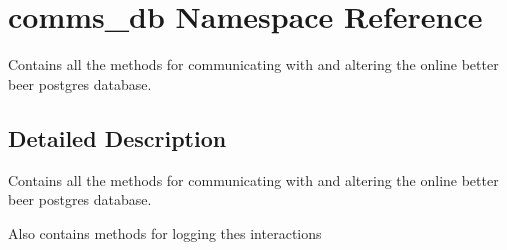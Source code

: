 \hypertarget{namespacecomms__db}{}\section{comms\+\_\+db Namespace Reference}
\label{namespacecomms__db}


Contains all the methods for communicating with and altering the online better beer postgres database.  




\subsection{Detailed Description}
Contains all the methods for communicating with and altering the online better beer postgres database. 

Also contains methods for logging thes interactions 